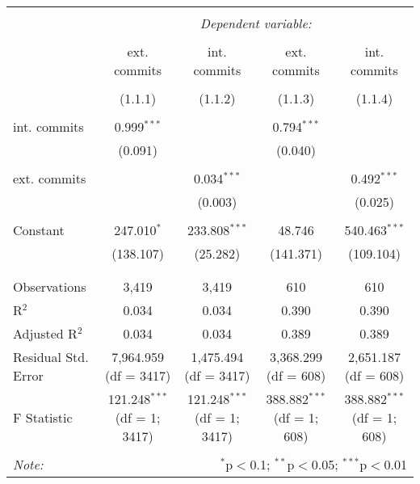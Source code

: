 
\begin{tabular}{@{\extracolsep{5pt}}lcccc}
\\[-1.8ex]\hline
\hline \\[-1.8ex]
 & \multicolumn{4}{c}{\textit{Dependent variable:}} \\
\cline{2-5}
\\[-1.8ex] & ext. commits & int. commits & ext. commits & int. commits \\
\\[-1.8ex] & (1.1.1) & (1.1.2) & (1.1.3) & (1.1.4)\\
\hline \\[-1.8ex]
 int. commits & 0.999$^{***}$ &  & 0.794$^{***}$ &  \\
  & (0.091) &  & (0.040) &  \\
  & & & & \\
 ext. commits &  & 0.034$^{***}$ &  & 0.492$^{***}$ \\
  &  & (0.003) &  & (0.025) \\
  & & & & \\
 Constant & 247.010$^{*}$ & 233.808$^{***}$ & 48.746 & 540.463$^{***}$ \\
  & (138.107) & (25.282) & (141.371) & (109.104) \\
  & & & & \\
\hline \\[-1.8ex]
Observations & 3,419 & 3,419 & 610 & 610 \\
R$^{2}$ & 0.034 & 0.034 & 0.390 & 0.390 \\
Adjusted R$^{2}$ & 0.034 & 0.034 & 0.389 & 0.389 \\
Residual Std. Error & 7,964.959 (df = 3417) & 1,475.494 (df = 3417) & 3,368.299 (df = 608) & 2,651.187 (df = 608) \\
F Statistic & 121.248$^{***}$ (df = 1; 3417) & 121.248$^{***}$ (df = 1; 3417) & 388.882$^{***}$ (df = 1; 608) & 388.882$^{***}$ (df = 1; 608) \\
\hline
\hline \\[-1.8ex]
\textit{Note:}  & \multicolumn{4}{r}{$^{*}$p$<$0.1; $^{**}$p$<$0.05; $^{***}$p$<$0.01} \\
\end{tabular}
